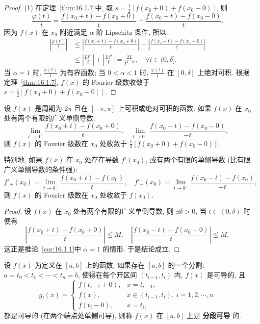 \begin{proof}
(1) 在定理~\ref{thm:16.1.7}中, 取 $s=\displaystyle\frac{1}{2}[f(x_{0}+0)+f(x_{0}-0)]$, 则
\[
  \frac{\varphi(t)}{t}=\frac{f(x_{0}+t)-f(x_{0}+0)}{t}+\frac{f(x_{0}-t)-f(x_{0}-0)}{t}.
\]
因为 $f(x)$ 在 $x_{0}$ 附近满足 $\alpha$ 阶 Lipschitz 条件, 所以
\[
  \begin{aligned}
    \left|\frac{\varphi(t)}{t}\right|&\leqslant\left|\frac{f(x_{0}+t)-f(x_{0}+0)}{t}\right|+\left|\frac{f(x_{0}-t)-f(x_{0}-0)}{t}\right|\\
    &\leqslant\left|\frac{Lt^{\alpha}}{t}\right|+\left|\frac{Lt^{\alpha}}{t}\right|=\frac{2L}{t^{1-\alpha}},\quad\forall t\in(0,\delta].
  \end{aligned}
\]
当 $\alpha=1$ 时, $\displaystyle\frac{\varphi(t)}{t}$ 为有界函数; 当 $0<\alpha<1$ 时, $\displaystyle\frac{\varphi(t)}{t}$ 在 $[0,\delta]$ 上绝对可积. 根据定理~\ref{thm:16.1.7}, $f(x)$ 的 Fourier 级数收敛于 $s=\displaystyle\frac{1}{2}[f(x_{0}+0)+f(x_{0}-0)]$.
\end{proof}

\begin{corollary}\label{cor:16.1.2}
设 $f(x)$ 是周期为 $2\pi$ 且在 $[-\pi,\pi]$ 上可积或绝对可积的函数. 如果 $f(x)$ 在 $x_{0}$ 处有两个有限的广义单侧导数:
\[
  \lim_{t\to 0^{+}}\frac{f(x_{0}+t)-f(x_{0}+0)}{t},\quad \lim_{t\to 0^{+}}\frac{f(x_{0}-t)-f(x_{0}-0)}{-t},
\]
则 $f(x)$ 的 Fourier 级数在 $x_{0}$ 处收敛于 $\displaystyle\frac{1}{2}[f(x_{0}+0)+f(x_{0}-0)]$.

特别地, 如果 $f(x)$ 在 $x_{0}$ 处存在导数 $f'(x_{0})$, 或有两个有限的单侧导数 (比有限广义单侧导数的条件强):
\[
  f'_{+}(x_{0})=\lim_{t\to 0^{+}}\frac{f(x_{0}+t)-f(x_{0})}{t},\quad f'_{-}(x_{0})=\lim_{t\to 0^{+}}\frac{f(x_{0}-t)-f(x_{0})}{-t},
\]
则 $f(x)$ 的 Fourier 级数在 $x_{0}$ 处收敛于 $f(x_{0})$.
\end{corollary}

\begin{proof}
设 $f(x)$ 在 $x_{0}$ 处有两个有限的广义单侧导数, 则 $\exists\delta>0$, 当 $t\in(0,\delta)$ 时便有
\[
  \left|\frac{f(x_{0}+t)-f(x_{0}+0)}{t}\right|\leqslant M,\quad \left|\frac{f(x_{0}-t)-f(x_{0}-0)}{t}\right|\leqslant M,
\]
这正是推论~\ref{cor:16.1.1}中 $\alpha=1$ 的情形. 于是结论成立.
\end{proof}

\begin{definition}\label{def:16.1.2}
设 $f(x)$ 为定义在 $[a,b]$ 上的函数, 如果存在 $[a,b]$ 的一个分割: $a=t_{0}<t_{1}<\cdots<t_{n}=b$, 使得在每个开区间 $(t_{i-1},t_{i})$ 内, $f(x)$ 是可导的, 且
\[
  g_{i}(x)=\begin{cases}
    f(t_{i-1}+0), & x=t_{i-1},\\
    f(x), & x\in(t_{i-1},t_{i}),\ i=1,2,\cdots,n\\
    f(t_{i}-0), & x=t_{i},
\end{cases}
\]
都是可导的 (在两个端点处单侧可导), 则称 $f(x)$ 在 $[a,b]$ 上是 \textbf{分段可导} 的.
\end{definition}

